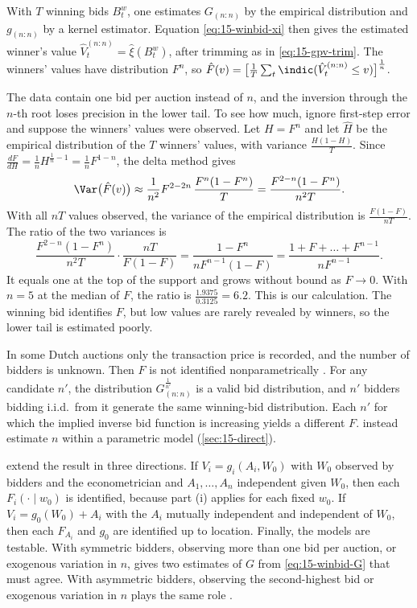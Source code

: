  With $T$ winning bids $B^w_t$, one estimates $G_{(n:n)}$ by the empirical distribution and $g_{(n:n)}$ by a kernel estimator. Equation \eqref{eq:15-winbid-xi} then gives the estimated winner's value $\hat V^{(n:n)}_t=\hat\xi(B^w_t)$, after trimming as in \eqref{eq:15-gpv-trim}. The winners' values have distribution $F^n$, so $\hat F(v)=\big[\frac1T\sum_t\indic(\hat V^{(n:n)}_t\le v)\big]^{\frac1n}$.

 The data contain one bid per auction instead of $n$, and the inversion through the $n$-th root loses precision in the lower tail. To see how much, ignore first-step error and suppose the winners' values were observed. Let $H=F^n$ and let $\hat H$ be the empirical distribution of the $T$ winners' values, with variance $\frac{H(1-H)}{T}$. Since $\frac{dF}{dH}=\frac1nH^{\frac1n-1}=\frac1nF^{1-n}$, the delta method gives
\[
\Var\big(\hat F(v)\big)\approx\frac{1}{n^2}F^{2-2n}\,\frac{F^n(1-F^n)}{T}=\frac{F^{2-n}(1-F^n)}{n^2T}.
\]
With all $nT$ values observed, the variance of the empirical distribution is $\frac{F(1-F)}{nT}$. The ratio of the two variances is
\[
\frac{F^{2-n}(1-F^n)}{n^2T}\cdot\frac{nT}{F(1-F)}=\frac{1-F^n}{nF^{n-1}(1-F)}=\frac{1+F+\dots+F^{n-1}}{nF^{n-1}}.
\]
It equals one at the top of the support and grows without bound as $F\to0$. With $n=5$ at the median of $F$, the ratio is $\frac{1.9375}{0.3125}=6.2$. This is our calculation. The winning bid identifies $F$, but low values are rarely revealed by winners, so the lower tail is estimated poorly.

 In some Dutch auctions only the transaction price is recorded, and the number of bidders is unknown. Then $F$ is not identified nonparametrically \citep[Section 3.3.1]{AtheyHaile2007}. For any candidate $n'$, the distribution $G_{(n:n)}^{\frac{1}{n'}}$ is a valid bid distribution, and $n'$ bidders bidding i.i.d.\ from it generate the same winning-bid distribution. Each $n'$ for which the implied inverse bid function is increasing yields a different $F$.  instead estimate $n$ within a parametric model (\cref{sec:15-direct}).

  extend the result in three directions. If $V_i=g_i(A_i,W_0)$ with $W_0$ observed by bidders and the econometrician and $A_1,\dots,A_n$ independent given $W_0$, then each $F_i(\cdot\mid w_0)$ is identified, because part (i) applies for each fixed $w_0$. If $V_i=g_0(W_0)+A_i$ with the $A_i$ mutually independent and independent of $W_0$, then each $F_{A_i}$ and $g_0$ are identified up to location. Finally, the models are testable. With symmetric bidders, observing more than one bid per auction, or exogenous variation in $n$, gives two estimates of $G$ from \eqref{eq:15-winbid-G} that must agree. With asymmetric bidders, observing the second-highest bid or exogenous variation in $n$ plays the same role \citep[Theorem 6(iv)--(v)]{AtheyHaile2002}.

